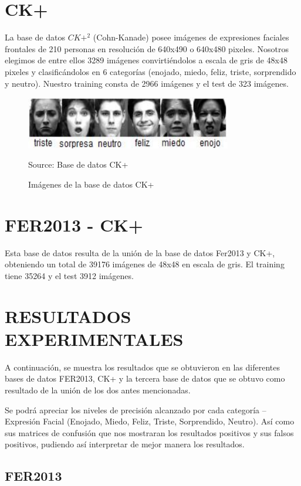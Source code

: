 \section{CK+}
La base de datos $CK+^{2}$ (Cohn-Kanade) posee imágenes de expresiones faciales
frontales de 210 personas en resolución de 640x490 o 640x480 pixeles. Nosotros
elegimos de entre ellos 3289 imágenes convirtiéndolos a escala de gris de 48x48 pixeles
y clasificándolos en 6 categorías (enojado, miedo, feliz, triste, sorprendido y neutro).
Nuestro training consta de 2966 imágenes y el test de 323 imágenes.

\begin{figure}[H]
		\centering
		\includegraphics[width=90mm]{./Imagenes/imagenes_ck+.png}
		\caption{Imágenes de la base de datos CK+}
		Source: Base de datos CK+
		\label{fig:imagenes_ck+}
\end{figure}


\section{FER2013 - CK+}
Esta base de datos resulta de la unión de la base de datos Fer2013 y CK+,
obteniendo un total de 39176 imágenes de 48x48 en escala de gris. El training tiene 35264
y el test 3912 imágenes.

\section{RESULTADOS EXPERIMENTALES}
A continuación, se muestra los resultados que se obtuvieron en las diferentes bases
de datos FER2013, CK+ y la tercera base de datos que se obtuvo como resultado de la
unión de los dos antes mencionadas.

Se podrá apreciar los niveles de precisión alcanzado por cada categoría –
Expresión Facial (Enojado, Miedo, Feliz, Triste, Sorprendido, Neutro). Así como sus
matrices de confusión que nos mostraran los resultados positivos y sus falsos positivos,
pudiendo así interpretar de mejor manera los resultados.

\subsection{FER2013}

